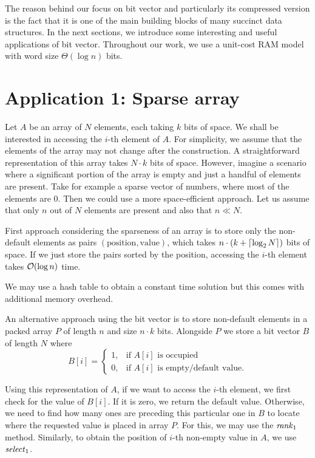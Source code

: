The reason behind our focus on bit vector and particularly its compressed version
is the fact that it is one of the main building blocks of many succinct data structures.
In the next sections, we introduce some interesting and useful applications of bit vector.
Throughout our work, we use a unit-cost RAM model with word size $\Theta(\log n)$ bits.

\section{Application 1: Sparse array}

Let $A$ be an array of $N$ elements, each taking $k$ bits of space. We shall be
interested in accessing the $i$-th element of $A$. For simplicity, we assume that
the elements of the array may not change after the construction. A straightforward
representation of this array takes $N\cdot k$ bits of space. However, imagine a
scenario where a significant portion of the array is empty and just a handful of
elements are present. Take for example a sparse vector of numbers, where most of
the elements are 0. Then we could use a more space-efficient approach. Let us
assume that only $n$ out of $N$ elements are present and also that $n\ll N$.

First approach considering the sparseness of an array is to store only the non-default
elements as pairs $(\text{position}, \text{value})$, which takes $n\cdot (k+\left\lceil \log_2 N \right\rceil)$
bits of space. If we just store the pairs sorted by the position, accessing the $i$-th
element takes $\mathcal{O}(\log n)$ time.

We may use a hash table to obtain a constant time solution but this comes with additional
memory overhead.

An alternative approach using the bit vector is to store non-default elements in
a packed array $P$ of length $n$ and size $n\cdot k$ bits. Alongside $P$ we store
a bit vector $B$ of length $N$ where
\[
   B[i]=
\begin{cases}
   1,& \text{if $A[i]$ is occupied} \\
   0,& \text{if $A[i]$ is empty/default value.}
\end{cases}
\]

Using this representation of $A$, if we want to access the $i$-th element, we first check for
the value of $B[i]$. If it is zero, we return the default value. Otherwise, we need to find
how many ones are preceding this particular one in $B$ to locate where the requested value is
placed in array $P$. For this, we may use the $\mathit{rank}_1$ method. Similarly, to obtain the
position of $i$-th non-empty value in $A$, we use $\mathit{select}_1$.

